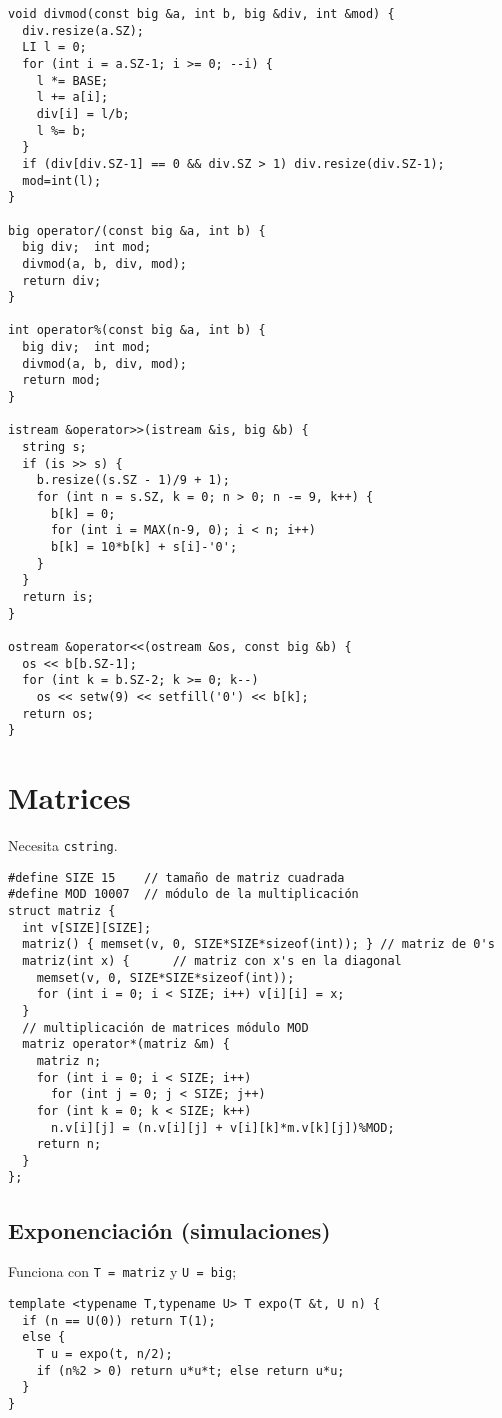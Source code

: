 \documentclass[10pt, a4, oneside]{article}
\begin{document}
\begin{verbatim}
void divmod(const big &a, int b, big &div, int &mod) {
  div.resize(a.SZ);
  LI l = 0;
  for (int i = a.SZ-1; i >= 0; --i) {
    l *= BASE;
    l += a[i];
    div[i] = l/b;
    l %= b;
  }
  if (div[div.SZ-1] == 0 && div.SZ > 1) div.resize(div.SZ-1);
  mod=int(l);
}

big operator/(const big &a, int b) {
  big div;  int mod;
  divmod(a, b, div, mod);
  return div;
}

int operator%(const big &a, int b) {
  big div;  int mod;
  divmod(a, b, div, mod);
  return mod;
}

istream &operator>>(istream &is, big &b) {
  string s;
  if (is >> s) {
    b.resize((s.SZ - 1)/9 + 1);
    for (int n = s.SZ, k = 0; n > 0; n -= 9, k++) {
      b[k] = 0;
      for (int i = MAX(n-9, 0); i < n; i++)
      b[k] = 10*b[k] + s[i]-'0';
    }
  }
  return is;
}

ostream &operator<<(ostream &os, const big &b) {
  os << b[b.SZ-1];
  for (int k = b.SZ-2; k >= 0; k--)
    os << setw(9) << setfill('0') << b[k];
  return os;
}
\end{verbatim}


\section{Matrices}
Necesita \verb-cstring-.
\begin{verbatim}
#define SIZE 15    // tamaño de matriz cuadrada
#define MOD 10007  // módulo de la multiplicación
struct matriz {
  int v[SIZE][SIZE];
  matriz() { memset(v, 0, SIZE*SIZE*sizeof(int)); } // matriz de 0's
  matriz(int x) {      // matriz con x's en la diagonal
    memset(v, 0, SIZE*SIZE*sizeof(int));
    for (int i = 0; i < SIZE; i++) v[i][i] = x;
  }
  // multiplicación de matrices módulo MOD
  matriz operator*(matriz &m) {
    matriz n;
    for (int i = 0; i < SIZE; i++)
      for (int j = 0; j < SIZE; j++)
    for (int k = 0; k < SIZE; k++)
      n.v[i][j] = (n.v[i][j] + v[i][k]*m.v[k][j])%MOD;
    return n;
  }
};
\end{verbatim}

\subsection{Exponenciación (simulaciones)}
Funciona con \verb-T = matriz- y \verb-U = big-;
\begin{verbatim}
template <typename T,typename U> T expo(T &t, U n) {
  if (n == U(0)) return T(1);
  else {
    T u = expo(t, n/2);
    if (n%2 > 0) return u*u*t; else return u*u;
  }
}
\end{verbatim}
\end{document}
